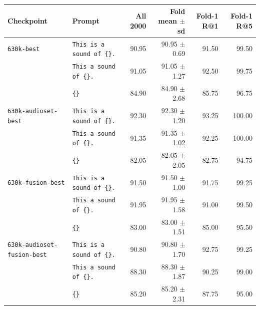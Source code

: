 \begin{tabular}{llrrrr}
\toprule
Checkpoint & Prompt & All 2000 & Fold mean $\pm$ sd & Fold-1 R@1 & Fold-1 R@5 \\
\midrule
\texttt{630k-best} & \texttt{This is a sound of \{\}.} & 90.95 & 90.95 $\pm$ 0.69 & 91.50 & 99.50 \\
\texttt{} & \texttt{This a sound of \{\}.} & 91.05 & 91.05 $\pm$ 1.27 & 92.50 & 99.75 \\
\texttt{} & \texttt{\{\}} & 84.90 & 84.90 $\pm$ 2.68 & 85.75 & 96.75 \\
\texttt{630k-audioset-best} & \texttt{This is a sound of \{\}.} & 92.30 & 92.30 $\pm$ 1.20 & 93.25 & 100.00 \\
\texttt{} & \texttt{This a sound of \{\}.} & 91.35 & 91.35 $\pm$ 1.02 & 92.25 & 100.00 \\
\texttt{} & \texttt{\{\}} & 82.05 & 82.05 $\pm$ 2.05 & 82.75 & 94.75 \\
\texttt{630k-fusion-best} & \texttt{This is a sound of \{\}.} & 91.50 & 91.50 $\pm$ 1.00 & 91.75 & 99.25 \\
\texttt{} & \texttt{This a sound of \{\}.} & 91.95 & 91.95 $\pm$ 1.58 & 91.00 & 99.50 \\
\texttt{} & \texttt{\{\}} & 83.00 & 83.00 $\pm$ 1.51 & 85.00 & 95.50 \\
\texttt{630k-audioset-fusion-best} & \texttt{This is a sound of \{\}.} & 90.80 & 90.80 $\pm$ 1.70 & 92.75 & 99.25 \\
\texttt{} & \texttt{This a sound of \{\}.} & 88.30 & 88.30 $\pm$ 1.87 & 90.25 & 99.00 \\
\texttt{} & \texttt{\{\}} & 85.20 & 85.20 $\pm$ 2.31 & 87.75 & 95.00 \\
\bottomrule
\end{tabular}